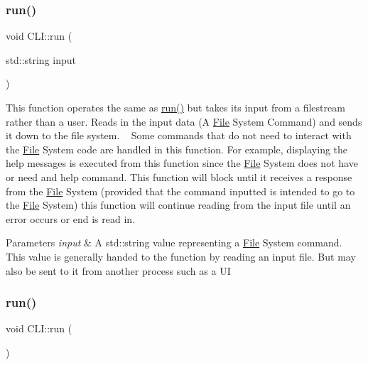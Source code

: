 \subsubsection{\texorpdfstring{run()}{run()}\hspace{0.1cm}{\footnotesize\ttfamily [1/2]}}
{\footnotesize\ttfamily void C\+L\+I\+::run (\begin{DoxyParamCaption}\item[{std\+::string}]{input }\end{DoxyParamCaption})}

This function operates the same as \mbox{\hyperlink{class_c_l_i_aeefc8cd81999836a90c2cfaced6177f1}{run()}} but takes its input from a filestream rather than a user. Reads in the input data (A \mbox{\hyperlink{class_file}{File}} System Command) and sends it down to the file system. ~\newline
Some commands that do not need to interact with the \mbox{\hyperlink{class_file}{File}} System code are handled in this function. For example, displaying the \textquotesingle{}help\textquotesingle{} messages is executed from this function since the \mbox{\hyperlink{class_file}{File}} System does not have or need and \textquotesingle{}help\textquotesingle{} command. This function will block until it receives a response from the \mbox{\hyperlink{class_file}{File}} System (provided that the command inputted is intended to go to the \mbox{\hyperlink{class_file}{File}} System) this function will continue reading from the input file until an error occurs or \textquotesingle{}end\textquotesingle{} is read in.


\begin{DoxyParams}{Parameters}
{\em input} & A std\+::string value representing a \mbox{\hyperlink{class_file}{File}} System command. This value is generally handed to the function by reading an input file. But may also be sent to it from another process such as a UI \\
\hline
\end{DoxyParams}
\mbox{\label{class_c_l_i_aeefc8cd81999836a90c2cfaced6177f1}} 
\subsubsection{\texorpdfstring{run()}{run()}\hspace{0.1cm}{\footnotesize\ttfamily [2/2]}}
{\footnotesize\ttfamily void C\+L\+I\+::run (\begin{DoxyParamCaption}{ }\end{DoxyParamCaption})}

